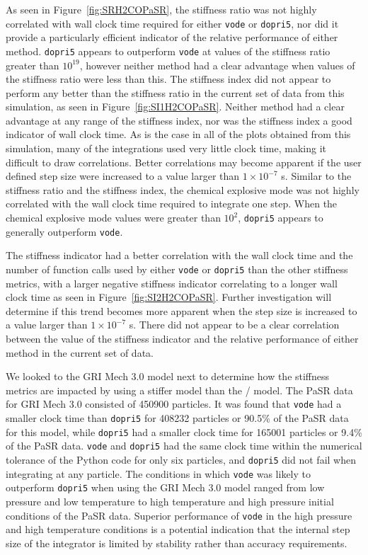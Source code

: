 \documentclass[12pt]{ussci}
\begin{document}
As seen in Figure~\ref{fig:SRH2COPaSR}, the stiffness ratio was not highly correlated with wall clock time required for either \texttt{vode} or \texttt{dopri5}, nor did it provide a particularly efficient indicator of the relative performance of either method.
\texttt{dopri5} appears to outperform \texttt{vode} at values of the stiffness ratio greater than $10^{19}$, however neither method had a clear advantage when values of the stiffness ratio were less than this.
The stiffness index did not appear to perform any better than the stiffness ratio in the current set of data from this simulation, as seen in Figure~\ref{fig:SI1H2COPaSR}.
Neither method had a clear advantage at any range of the stiffness index, nor was the stiffness index a good indicator of wall clock time.
As is the case in all of the plots obtained from this simulation, many of the integrations used very little clock time, making it difficult to draw correlations.
Better correlations may become apparent if the user defined step size were increased to a value larger than $1 \times 10^{-7}$ s.
Similar to the stiffness ratio and the stiffness index, the chemical explosive mode was not highly correlated with the wall clock time required to integrate one step.
When the chemical explosive mode values were greater than $10^2$, \texttt{dopri5} appears to generally outperform \texttt{vode}.

The stiffness indicator had a better correlation with the wall clock time and the number of function calls used by either \texttt{vode} or \texttt{dopri5} than the other stiffness metrics, with a larger negative stiffness indicator correlating to a longer wall clock time as seen in Figure~\ref{fig:SI2H2COPaSR}.
Further investigation will determine if this trend becomes more apparent when the step size is increased to a value larger than $1 \times 10^{-7}$ s.
There did not appear to be a clear correlation between the value of the stiffness indicator and the relative performance of either method in the current set of data.

We looked to the GRI Mech 3.0 model next to determine how the stiffness metrics are impacted by using a stiffer model than the \slash {} model.
The PaSR data for GRI Mech 3.0 consisted of 450900 particles.
It was found that \texttt{vode} had a smaller clock time than \texttt{dopri5} for 408232 particles or 90.5\% of the PaSR data for this model, while \texttt{dopri5} had a smaller clock time for 165001 particles or 9.4\% of the PaSR data.
\texttt{vode} and \texttt{dopri5} had the same clock time within the numerical tolerance of the Python code for only six particles, and \texttt{dopri5} did not fail when integrating at any particle.
The conditions in which \texttt{vode} was likely to outperform \texttt{dopri5} when using the GRI Mech 3.0 model ranged from low pressure and low temperature to high temperature and high pressure initial conditions of the PaSR data.
Superior performance of \texttt{vode} in the high pressure and high temperature conditions is a potential indication that the internal step size of the integrator is limited by stability rather than accuracy requirements.
\end{document}
